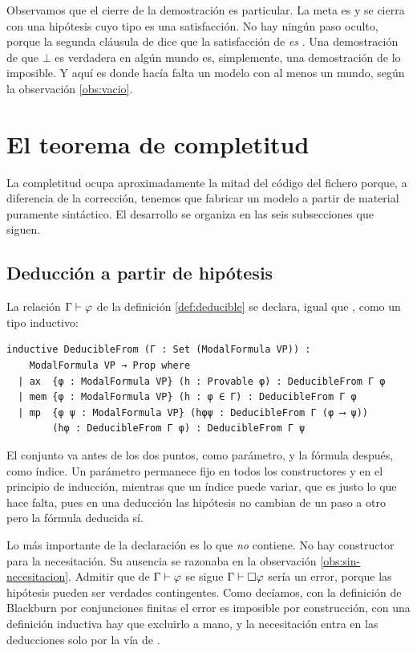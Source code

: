 Observamos que el cierre de la demostración es particular. La meta es  y se cierra con una hipótesis cuyo tipo es una satisfacción. No hay ningún paso oculto, porque la segunda cláusula de  dice que la satisfacción de  \emph{es} . Una demostración de que $\bot$ es verdadera en algún mundo es, simplemente, una demostración de lo imposible. Y aquí es donde hacía falta un modelo con al menos un mundo, según la observación \ref{obs:vacio}.

\section{El teorema de completitud}\label{sec:form-completitud}

La completitud ocupa aproximadamente la mitad del código del fichero porque, a diferencia de la corrección, tenemos que fabricar un modelo a partir de material puramente sintáctico. El desarrollo se organiza en las seis subsecciones que siguen.

\subsection{Deducción a partir de hipótesis}\label{subsec:comp-ded}

La relación $\Gamma \vdash \varphi$ de la definición \ref{def:deducible} se declara, igual que , como un tipo inductivo:

\begin{lstlisting}
inductive DeducibleFrom (Γ : Set (ModalFormula VP)) :
    ModalFormula VP → Prop where
  | ax  {φ : ModalFormula VP} (h : Provable φ) : DeducibleFrom Γ φ
  | mem {φ : ModalFormula VP} (h : φ ∈ Γ) : DeducibleFrom Γ φ
  | mp  {φ ψ : ModalFormula VP} (hφψ : DeducibleFrom Γ (φ ⟶ ψ))
        (hφ : DeducibleFrom Γ φ) : DeducibleFrom Γ ψ
\end{lstlisting}

El conjunto  va antes de los dos puntos, como parámetro, y la fórmula después, como índice. Un parámetro permanece fijo en todos los constructores y en el principio de inducción, mientras que un índice puede variar, que es justo lo que hace falta, pues en una deducción las hipótesis no cambian de un paso a otro pero la fórmula deducida sí.

Lo más importante de la declaración es lo que \emph{no} contiene. No hay constructor para la necesitación. Su ausencia se razonaba en la observación \ref{obs:sin-necesitacion}. Admitir que de $\Gamma \vdash \varphi$ se sigue $\Gamma \vdash \square\varphi$ sería un error, porque las hipótesis pueden ser verdades contingentes. Como decíamos, con la definición de Blackburn por conjunciones finitas el error es imposible por construcción, con una definición inductiva hay que excluirlo a mano, y la necesitación entra en las deducciones solo por la vía de .

